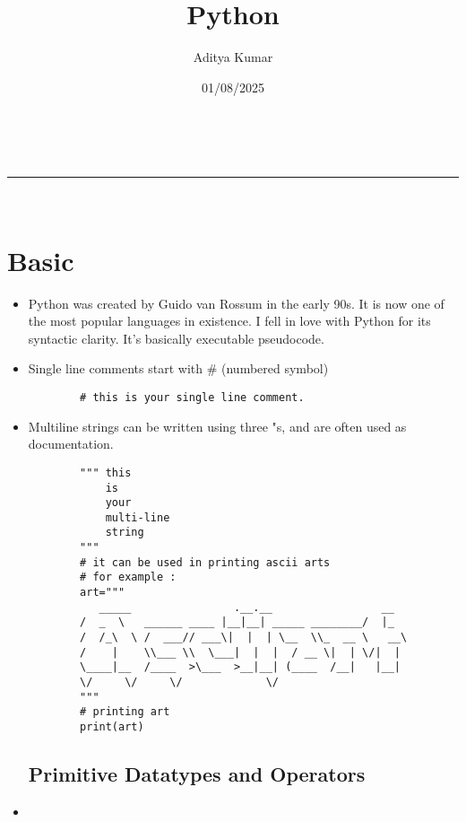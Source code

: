 \documentclass[a4paper,11pt]{article}
\makeatletter
\newcommand{\linia}{\rule{\linewidth}{0.5pt}}
\theoremstyle{mytheor}
\renewcommand{\maketitle}{
\begin{center}
\vspace{2ex}
{\huge \textsc{\@title}}
\vspace{1ex}
\\
\linia\\
\@author \hfill \@date
\vspace{4ex}
\end{center}
}
\makeatother
\begin{document}
\title{Python}

\author{Aditya Kumar}

\date{01/08/2025}

\maketitle
	
\section{Basic}

\begin{itemize}
	\item Python was created by Guido van Rossum in the early 90s. It is now one of the most popular languages in existence. I fell in love with Python for its syntactic clarity. It's basically executable pseudocode.
	\item Single line comments start with \# (numbered symbol)
	
	\begin{lstlisting}
		# this is your single line comment.
	\end{lstlisting}
	
	\item Multiline strings can be written
	using three "s, and are often used
	as documentation.
	
	\begin{lstlisting}
		""" this
			is
			your
			multi-line
			string
		"""
		# it can be used in printing ascii arts
		# for example :
		art="""
		   _____                .__.__                 __   
		/  _  \   ______ ____ |__|__| _____ ________/  |_ 
		/  /_\  \ /  ___// ___\|  |  | \__  \\_  __ \   __\
		/    |    \\___ \\  \___|  |  |  / __ \|  | \/|  |  
		\____|__  /____  >\___  >__|__| (____  /__|   |__|  
		\/     \/     \/             \/             
		"""
		# printing art
		print(art)
	\end{lstlisting}
	\subsection{Primitive Datatypes and Operators}
	\item 
\end{itemize}
\end{document}
